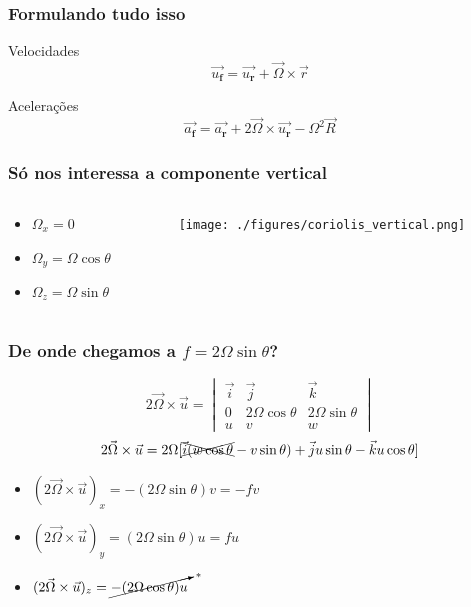 \begin{frame}
  \frametitle{Formulando tudo isso}
  \begin{block}{Velocidades}
    \[
      \vec{u_{\mathbf{f}}} = \vec{u_{\mathbf{r}}} + \vec{\Omega} \times \vec{r}
    \]
  \end{block}

  \begin{block}{Acelerações}
    \[
      \vec{a_{\mathbf{f}}} = \vec{a_{\mathbf{r}}} + 2 \vec{\Omega} \times
      \vec{u_{\mathbf{r}}} - \Omega^2\vec{R}
    \]
  \end{block}
\end{frame}


\begin{frame}
  \frametitle{Só nos interessa a componente vertical}
  \begin{columns}
    \begin{column}{0.5\textwidth}
      \begin{itemize}
        \item $\Omega_x = 0$
        \item $\Omega_y = \Omega\cos\theta$
        \item $\Omega_z = \Omega\sin\theta$
      \end{itemize}
    \end{column}
    \begin{column}{0.5\textwidth}
      \begin{center}
        \texttt{[image: ./figures/coriolis\_vertical.png]}
      \end{center}
    \end{column}
  \end{columns}
\end{frame}

\begin{frame}
  \frametitle{De onde chegamos a $f = 2\Omega\sin{\theta}$?}
  \[
    2\vec{\Omega} \times \vec{u} =
    \begin{vmatrix}
    \vec{i} & \vec{j}           & \vec{k}\\
    0       & 2\Omega\cos\theta & 2\Omega\sin\theta\\
    u       & v                 & w
    \end{vmatrix}
  \]
  \pause
  \[
    2\vec{\Omega} \times \vec{u} =
    2\Omega [\xcancel{\vec{i}(w\cos\theta} - v\sin\theta) +
             \vec{j}u\sin\theta - \vec{k}u\cos\theta]
  \]
  \pause
  \begin{itemize}
    \item $(2\vec{\Omega} \times \vec{u})_x = -(2\Omega\sin\theta)v = -fv$
    \item $(2\vec{\Omega} \times \vec{u})_y = (2\Omega\sin\theta)u = fu$
    \item $(2\vec{\Omega} \times \vec{u})_z = \cancelto{*}{-(2\Omega\cos\theta)u}$
  \end{itemize}
\end{frame}


